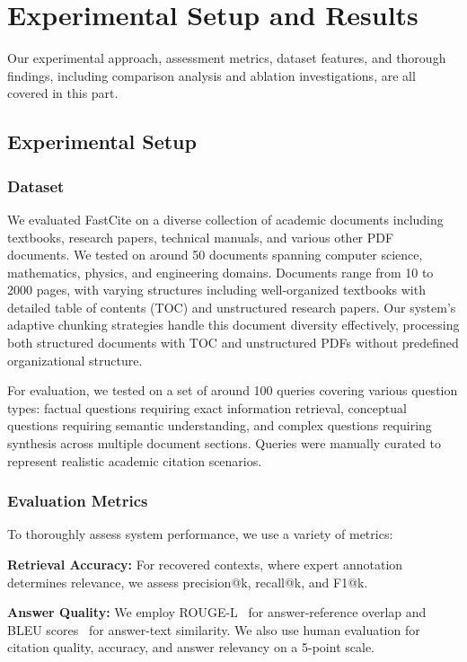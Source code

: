 \documentclass[runningheads]{llncs}
\begin{document}
%
%
\section{Experimental Setup and Results}

Our experimental approach, assessment metrics, dataset features, and thorough findings, including comparison analysis and ablation investigations, are all covered in this part.

\subsection{Experimental Setup}

\subsubsection{Dataset}

We evaluated FastCite on a diverse collection of academic documents including textbooks, research papers, technical manuals, and various other PDF documents. We tested on around 50 documents spanning computer science, mathematics, physics, and engineering domains. Documents range from 10 to 2000 pages, with varying structures including well-organized textbooks with detailed table of contents (TOC) and unstructured research papers. Our system's adaptive chunking strategies handle this document diversity effectively, processing both structured documents with TOC and unstructured PDFs without predefined organizational structure.

For evaluation, we tested on a set of around 100 queries covering various question types: factual questions requiring exact information retrieval, conceptual questions requiring semantic understanding, and complex questions requiring synthesis across multiple document sections. Queries were manually curated to represent realistic academic citation scenarios.

\subsubsection{Evaluation Metrics}

To thoroughly assess system performance, we use a variety of metrics:

\textbf{Retrieval Accuracy:} For recovered contexts, where expert annotation determines relevance, we assess precision@k, recall@k, and F1@k.

\textbf{Answer Quality:} We employ ROUGE-L~\cite{lin2004rouge} for answer-reference overlap and BLEU scores~\cite{papineni2002bleu} for answer-text similarity. We also use human evaluation for citation quality, accuracy, and answer relevancy on a 5-point scale.
\end{document}
